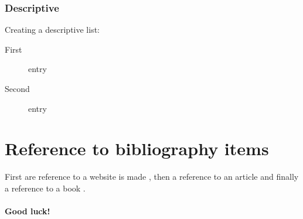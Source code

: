 \subsubsection{Descriptive}
Creating a descriptive list:
\begin{description}
  \item[First] entry
  \item[Second] entry
\end{description}


\section{Reference to bibliography items} \label{sec:bibliography}
First are reference to a website is made \cite{MiscEntry}, then a reference to an article \cite{ArticleEntry} and finally a reference to a book \cite{last2012}.

\paragraph{Good luck!}